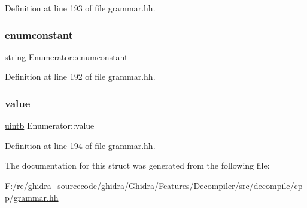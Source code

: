 Definition at line 193 of file grammar.\+hh.

\mbox{\label{struct_enumerator_a184991db56a2b8f47f9e6967e3005c23}} 
\subsubsection{\texorpdfstring{enumconstant}{enumconstant}}
{\footnotesize\ttfamily string Enumerator\+::enumconstant}



Definition at line 192 of file grammar.\+hh.

\mbox{\label{struct_enumerator_a7a5f9e3d9be753ba75cf267ac3e73930}} 
\subsubsection{\texorpdfstring{value}{value}}
{\footnotesize\ttfamily \mbox{\hyperlink{types_8h_a2db313c5d32a12b01d26ac9b3bca178f}{uintb}} Enumerator\+::value}



Definition at line 194 of file grammar.\+hh.



The documentation for this struct was generated from the following file\+:\begin{DoxyCompactItemize}
\item 
F\+:/re/ghidra\+\_\+sourcecode/ghidra/\+Ghidra/\+Features/\+Decompiler/src/decompile/cpp/\mbox{\hyperlink{grammar_8hh}{grammar.\+hh}}\end{DoxyCompactItemize}
